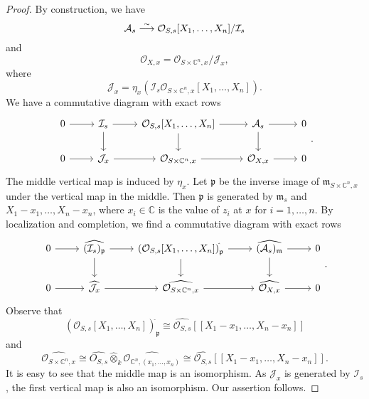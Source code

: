 \begin{proof}
    By construction, we have
    \[
        \mathcal{A}_s\stackrel{\sim}{\longrightarrow} \mathcal{O}_{S,s}[X_1,\ldots,X_n]/\mathcal{I}_s  
    \]
    and
    \[
        \mathcal{O}_{X,x}=\mathcal{O}_{S\times \mathbb{C}^n,x}/\mathcal{J}_x,  
    \]
    where
    \[
        \mathcal{J}_x=\eta_x\left( \mathcal{I}_s \mathcal{O}_{S\times \mathbb{C}^n,x}[X_1,\ldots,X_n] \right).   
    \]
    We have a commutative diagram with exact rows
    \[
        \begin{tikzcd}
            0 \arrow[r] & \mathcal{I}_s \arrow[r] \arrow[d] & {\mathcal{O}_{S,s}[X_1,\ldots,X_n]} \arrow[r] \arrow[d] & \mathcal{A}_s \arrow[r] \arrow[d] & 0 \\
            0 \arrow[r] & \mathcal{J}_x \arrow[r]           & {\mathcal{O}_{S\times \mathbb{C}^n,x}} \arrow[r]        & {\mathcal{O}_{X,x}} \arrow[r]     & 0
        \end{tikzcd}.  
    \]
    The middle vertical map is induced by $\eta_x$.
    Let $\mathfrak{p}$ be the inverse image of $\mathfrak{m}_{S\times \mathbb{C}^n,x}$ under the vertical map in the middle. Then $\mathfrak{p}$ is generated by $\mathfrak{m}_s$ and $X_1-x_1,\ldots,X_n-x_n$, where $x_i\in \mathbb{C}$ is the value of $z_i$ at $x$ for $i=1,\ldots,n$.  By localization and completion, we find a commutative diagram with exact rows
    \[
        \begin{tikzcd}
            0 \arrow[r] & \widehat{(\mathcal{I}_s)_{\mathfrak{p}}} \arrow[r] \arrow[d] & {(\mathcal{O}_{S,s}[X_1,\ldots,X_n])^{\hat{}}_{\mathfrak{p}}} \arrow[r] \arrow[d] & \widehat{(\mathcal{A}_s)_{\mathfrak{m}}} \arrow[r] \arrow[d] & 0 \\
            0 \arrow[r] & \widehat{\mathcal{J}_x} \arrow[r]           & \widehat{\mathcal{O}_{S\times \mathbb{C}^n,x}} \arrow[r]        & \widehat{\mathcal{O}_{X,x}} \arrow[r]     & 0
        \end{tikzcd}.  
    \]
    Observe that
    \[
        (\mathcal{O}_{S,s}[X_1,\ldots,X_n])^{\hat{}}_{\mathfrak{p}}  \cong \widehat{\mathcal{O}_{S,s}}[[X_1-x_1,\ldots,X_n-x_n]]
    \]
    and
    \[
        \widehat{\mathcal{O}_{S\times \mathbb{C}^n,x}}\cong \widehat{O_{S,s}}\hat{\otimes}_k  \widehat{\mathcal{O}_{\mathbb{C}^n,(x_1,\ldots,x_n)}}\cong \widehat{\mathcal{O}_{S,s}}[[X_1-x_1,\ldots,X_n-x_n]].
    \]
    It is easy to see that the middle map is an isomorphism. As $\mathcal{J}_x$ is generated by $\mathcal{I}_s$, the first vertical map is also an isomorphism. Our assertion follows. 
\end{proof}


